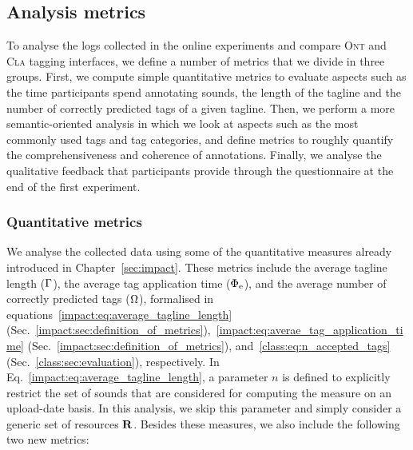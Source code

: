 \subsection{Analysis metrics}
\label{sec:ontology:analysis_metrics}

To analyse the logs collected in the online experiments and compare \textsc{Ont} and \textsc{Cla} tagging interfaces, we define a number of metrics that we divide in three groups. First, we compute simple quantitative metrics to evaluate aspects such as the time participants spend annotating sounds, the length of the tagline  and the number of correctly predicted tags of a given tagline.
Then, we perform a more semantic-oriented analysis in which we look at aspects such as the most commonly used tags and tag categories, and define metrics to roughly quantify the comprehensiveness and coherence of annotations.
Finally, we analyse the qualitative feedback that participants provide through the questionnaire at the end of the first experiment.


\subsubsection{Quantitative metrics}

We analyse the collected data using some of the quantitative measures already introduced in Chapter~\ref{sec:impact}.
These metrics include the average tagline length ($\Gamma$), the average tag application time ($\Phi_{\text{e}}$), and the average number of correctly predicted tags ($\Omega$), formalised in equations~\ref{impact:eq:average_tagline_length} (Sec.~\ref{impact:sec:definition_of_metrics}),~\ref{impact:eq:averae_tag_application_time} (Sec.~\ref{impact:sec:definition_of_metrics}), and~\ref{class:eq:n_accepted_tags} (Sec.~\ref{class:sec:evaluation}), respectively.
In Eq.~\ref{impact:eq:average_tagline_length}, a parameter $n$ is defined to explicitly restrict the set of sounds that are considered for computing the measure on an upload-date basis. In this analysis, we skip this parameter and simply consider a generic set of resources $\mathbf{R}$. 
Besides these measures, we also include the following two new metrics:

